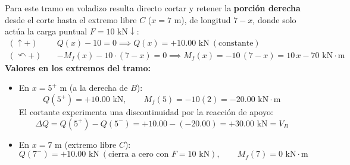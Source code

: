 Para este tramo en voladizo resulta directo cortar y retener la \textbf{porción derecha} desde el corte hasta el extremo libre $C$ ($x = 7\text{ m}$), de longitud $7 - x$, donde solo actúa la carga puntual $F = 10\text{ kN}\downarrow$:
\begin{align*}
    (\uparrow +) \quad &Q(x) - 10 = 0 \implies \boxed{Q(x) = +10.00\text{ kN}} \ (\text{constante}) \\
    (\curvearrowleft +) \quad &-M_f(x) - 10 \cdot (7 - x) = 0 \implies \boxed{M_f(x) = -10\,(7 - x) = 10\,x - 70\text{ kN}\cdot\text{m}}
\end{align*}
\textbf{Valores en los extremos del tramo:}
\begin{itemize}
    \item En $x = 5^+\text{ m}$ (a la derecha de $B$):
    \[
        Q(5^+) = +10.00\text{ kN}, \qquad M_f(5) = -10(2) = -20.00\text{ kN}\cdot\text{m}
    \]
    El cortante experimenta una discontinuidad por la reacción de apoyo:
    \[
        \Delta Q = Q(5^+) - Q(5^-) = +10.00 - (-20.00) = +30.00\text{ kN} = V_B
    \]
    \item En $x = 7\text{ m}$ (extremo libre $C$):
    \[
        Q(7^-) = +10.00\text{ kN} \ (\text{cierra a cero con } F = 10\text{ kN}), \qquad M_f(7) = 0\text{ kN}\cdot\text{m}
    \]
\end{itemize}


